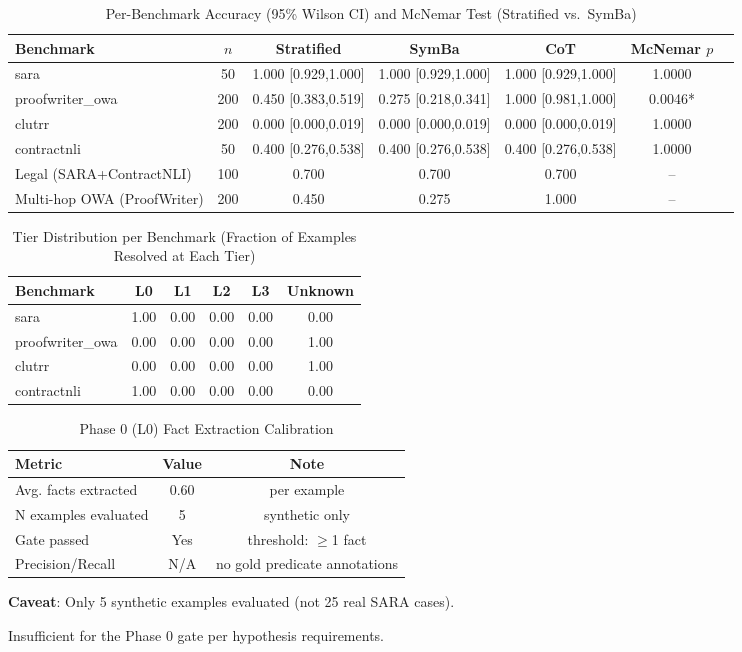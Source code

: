 \usepackage{booktabs}

\begin{table}[h]
\centering
\caption{Per-Benchmark Accuracy (95\% Wilson CI) and McNemar Test (Stratified vs.\ SymBa)}
\label{tab:accuracy}
\begin{tabular}{lcccccc}
\toprule
Benchmark & $n$ & Stratified & SymBa & CoT & McNemar $p$ \\
\midrule
sara & 50 & 1.000 [0.929,1.000] & 1.000 [0.929,1.000] & 1.000 [0.929,1.000] & 1.0000 \\
proofwriter_owa & 200 & 0.450 [0.383,0.519] & 0.275 [0.218,0.341] & 1.000 [0.981,1.000] & 0.0046* \\
clutrr & 200 & 0.000 [0.000,0.019] & 0.000 [0.000,0.019] & 0.000 [0.000,0.019] & 1.0000 \\
contractnli & 50 & 0.400 [0.276,0.538] & 0.400 [0.276,0.538] & 0.400 [0.276,0.538] & 1.0000 \\
\midrule
Legal (SARA+ContractNLI) & 100 & 0.700 & 0.700 & 0.700 & -- \\
Multi-hop OWA (ProofWriter) & 200 & 0.450 & 0.275 & 1.000 & -- \\
\bottomrule
\end{tabular}
\end{table}

\begin{table}[h]
\centering
\caption{Tier Distribution per Benchmark (Fraction of Examples Resolved at Each Tier)}
\label{tab:tier}
\begin{tabular}{lccccc}
\toprule
Benchmark & L0 & L1 & L2 & L3 & Unknown \\
\midrule
sara & 1.00 & 0.00 & 0.00 & 0.00 & 0.00 \\
proofwriter_owa & 0.00 & 0.00 & 0.00 & 0.00 & 1.00 \\
clutrr & 0.00 & 0.00 & 0.00 & 0.00 & 1.00 \\
contractnli & 1.00 & 0.00 & 0.00 & 0.00 & 0.00 \\
\bottomrule
\end{tabular}
\end{table}

\begin{table}[h]
\centering
\caption{Phase 0 (L0) Fact Extraction Calibration}
\label{tab:phase0}
\begin{tabular}{lcc}
\toprule
Metric & Value & Note \\
\midrule
Avg. facts extracted & 0.60 & per example \\
N examples evaluated & 5 & synthetic only \\
Gate passed & Yes & threshold: $\geq$1 fact \\
Precision/Recall & N/A & no gold predicate annotations \\
\bottomrule
\end{tabular}
\begin{tablenotes}\small
\item \textbf{Caveat}: Only 5 synthetic examples evaluated (not 25 real SARA cases).
\item Insufficient for the Phase 0 gate per hypothesis requirements.
\end{tablenotes}
\end{table}